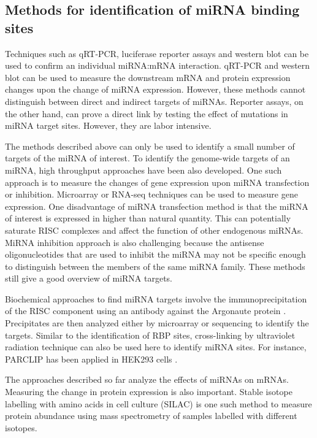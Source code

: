 \subsection{Methods for identification of miRNA binding sites}

Techniques such as qRT-PCR, luciferase reporter assays and western blot can be used to confirm an individual miRNA:mRNA interaction. qRT-PCR and western blot can be used to measure the downstream mRNA and protein expression changes upon the change of miRNA expression. However, these methods cannot distinguish between direct and indirect targets of miRNAs. Reporter assays, on the other hand, can prove a direct link by testing the effect of mutations in miRNA target sites. However, they are labor intensive. 

The methods described above can only be used to identify a small number of targets of the miRNA of interest. To identify the genome-wide targets of an miRNA, high throughput approaches have been also developed. One such approach is to measure the changes of gene expression upon miRNA transfection or inhibition. Microarray or RNA-seq techniques can be used to measure gene expression. One disadvantage of miRNA transfection method is that the miRNA of interest is expressed in higher than natural quantity. This can potentially saturate RISC complexes and affect the function of other endogenous miRNAs. MiRNA inhibition approach is also challenging because the antisense oligonucleotides that are used to inhibit the miRNA may not be specific enough to distinguish between the members of the same miRNA family. These methods still give a good overview of miRNA targets. 

Biochemical approaches to find miRNA targets involve the immunoprecipitation of the RISC component using an antibody against the Argonaute protein \cite{karginov_2007}. Precipitates are then analyzed either by microarray or sequencing to identify the targets. Similar to the identification of RBP sites, cross-linking by ultraviolet radiation technique can also be used here to identify miRNA sites. For instance, PARCLIP has been applied in HEK293 cells \cite{hafner_10}.

The approaches described so far analyze the effects of miRNAs on mRNAs. Measuring the change in protein expression is also important. Stable isotope labelling with amino acids in cell culture (SILAC) is one such method to measure protein abundance using mass spectrometry of samples labelled with different isotopes.



